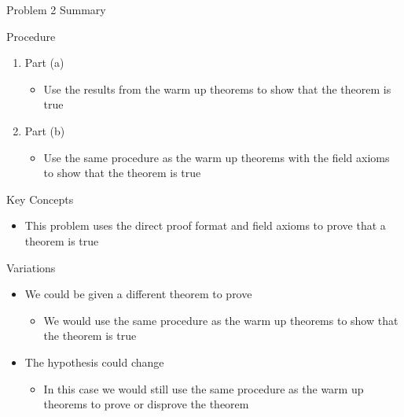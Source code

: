\begin{summary}{Problem 2 Summary}
    \begin{statement}{Procedure}
        \begin{enumerate}[label = (\alph*)]
            \item Part (a)
            \begin{itemize}
                \item Use the results from the warm up theorems to show that the theorem is true
            \end{itemize}
            \item Part (b)
            \begin{itemize}
                \item Use the same procedure as the warm up theorems with the field axioms to show that the theorem is true
            \end{itemize}
        \end{enumerate}
    \end{statement}
    \begin{statement}{Key Concepts}
        \begin{itemize}
            \item This problem uses the direct proof format and field axioms to prove that a theorem is true
        \end{itemize}
    \end{statement}
    \begin{statement}{Variations}
        \begin{itemize}
            \item We could be given a different theorem to prove
            \begin{itemize}
                \item We would use the same procedure as the warm up theorems to show that the theorem is true
            \end{itemize}
            \item The hypothesis could change
            \begin{itemize}
                \item In this case we would still use the same procedure as the warm up theorems to prove or disprove the theorem
            \end{itemize}
        \end{itemize}
    \end{statement}
\end{summary}

